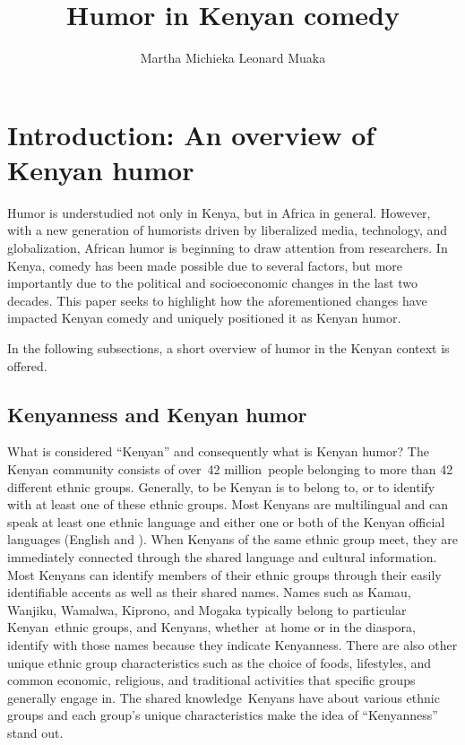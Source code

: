 \documentclass[output=paper]{langsci/langscibook}
\title{Humor in Kenyan comedy}
\author{%
 Martha Michieka   \affiliation{ East Tennessee State University}\lastand 
 Leonard Muaka\affiliation{Winston Salem State University, North Carolina}
}
\begin{document}
 

\section{Introduction: An overview of Kenyan humor}

Humor is understudied not only in Kenya, but in Africa in general. However, with a new generation of humorists driven by liberalized media, technology, and globalization, African humor is beginning to draw attention from researchers. In Kenya, comedy has been made possible due to several factors, but more importantly due to the political and socioeconomic changes in the last two decades. This paper seeks to highlight how the aforementioned changes have impacted Kenyan comedy and uniquely positioned it as Kenyan humor. 

In the following subsections, a short overview of humor in the Kenyan context is offered.

\subsection{Kenyanness and Kenyan humor}\label{sec:muaka:1.1}

What is considered “Kenyan” and consequently what is Kenyan humor? The Kenyan community consists of over~42 million~people belonging to more than 42 different ethnic groups. Generally, to be Kenyan is to belong to, or to identify with at least one of these ethnic groups. Most Kenyans are multilingual and can speak at least one ethnic language and either one or both of the Kenyan official languages (English and ). When Kenyans of the same ethnic group meet, they are immediately connected through the shared language and cultural information. Most Kenyans can identify members of their ethnic groups through their easily identifiable accents as well as their shared names. Names such as Kamau, Wanjiku, Wamalwa, Kiprono, and Mogaka typically belong to particular Kenyan~ethnic groups, and Kenyans, whether~at home or in the diaspora, identify with those names because they indicate Kenyanness. There are also other unique ethnic group characteristics such as the choice of foods, lifestyles, and common economic, religious, and traditional activities that specific groups generally engage in. The shared knowledge~Kenyans have about various ethnic groups and each group’s unique characteristics make the idea of “Kenyanness” stand out.
\end{document}
